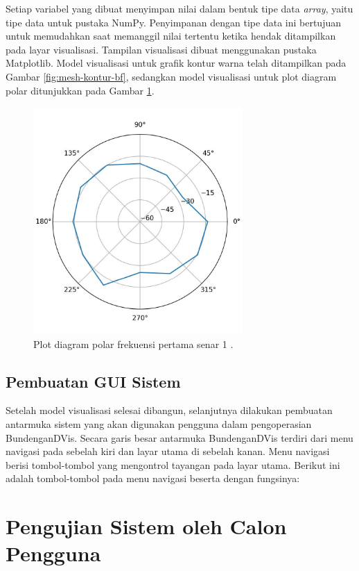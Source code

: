 Setiap variabel yang dibuat menyimpan nilai dalam bentuk tipe data \emph{array}, yaitu tipe data untuk pustaka NumPy. Penyimpanan dengan tipe data ini bertujuan untuk memudahkan saat memanggil nilai tertentu ketika hendak ditampilkan pada layar visualisasi. Tampilan visualisasi dibuat menggunakan pustaka Matplotlib. Model visualisasi untuk grafik kontur warna telah ditampilkan pada Gambar \ref{fig:mesh-kontur-bf}, sedangkan model visualisasi untuk plot diagram polar ditunjukkan pada Gambar \ref{fig:polar-plot-contoh}. \par 

\begin{figure}[h!]
	\centering
	\includegraphics[width=8cm]{Gambar/polar-contoh.jpg}
	\caption{Plot diagram polar frekuensi \overtone pertama senar 1 .}
	\label{fig:polar-plot-contoh}
\end{figure}

\subsection{Pembuatan GUI Sistem}
Setelah model visualisasi selesai dibangun, selanjutnya dilakukan pembuatan antarmuka sistem yang akan digunakan pengguna dalam pengoperasian BundenganDVis. Secara garis besar antarmuka BundenganDVis terdiri dari menu navigasi pada sebelah kiri dan layar utama di sebelah kanan. Menu navigasi berisi tombol-tombol yang mengontrol tayangan pada layar utama. Berikut ini adalah tombol-tombol pada menu navigasi beserta dengan fungsinya: \par 

\section{Pengujian Sistem oleh Calon Pengguna}
\lipsum[6]
